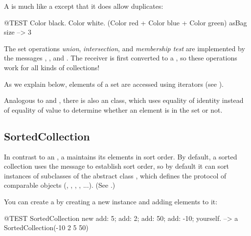 \documentclass[a4paper,10pt,twoside]{book}
\begin{document}
A  is much like a  except that it does allow duplicates:
\begin{code}{@TEST}
{ Color black. Color white. (Color red + Color blue + Color green) } asBag size --> 3
\end{code}

The set operations \emph{union}, \emph{intersection}, and \emph{membership test} are implemented by the  messages , , and .
The receiver is first converted to a , so these operations work for all kinds of collections!


As we explain below, elements of a set are accessed using iterators (see ).

Analogous to  and , there is also an  class, which uses equality of identity instead of equality of value to determine whether an element is in the set or not.

\subsection{SortedCollection}
In contrast to an , a  maintains its elements in sort order.
By default, a sorted collection uses the message  to establish sort order, so by default it can sort instances of subclasses of the abstract class , which defines the protocol of comparable objects (, , , , ...).
(See .)

You can create a  by creating a new instance and adding elements to it:
\begin{code}{@TEST}
SortedCollection new add: 5; add: 2; add: 50; add: -10; yourself. --> a SortedCollection(-10 2 5 50)
\end{code}
\end{document}
